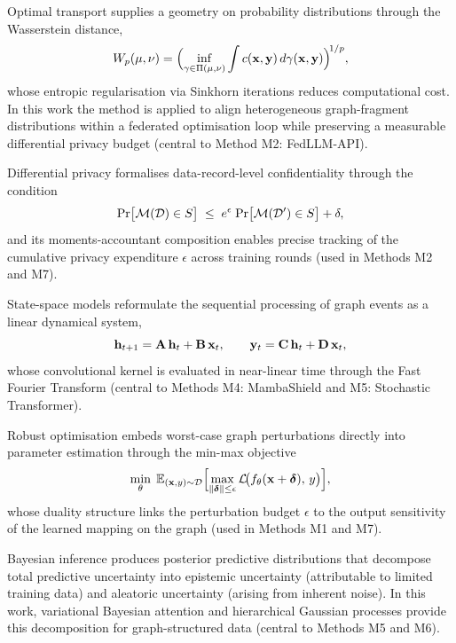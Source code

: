Optimal transport supplies a geometry on probability distributions through the Wasserstein distance,
\begin{equation}
W_p(\mu,\nu)
= \Bigl(\inf_{\gamma\in\Pi(\mu,\nu)}
    \int c(\mathbf{x},\mathbf{y})\,d\gamma(\mathbf{x},\mathbf{y})
  \Bigr)^{\!1/p},
\label{eq:wasserstein}
\end{equation}
whose entropic regularisation via Sinkhorn iterations reduces computational cost. In this work the method is applied to align heterogeneous graph-fragment distributions within a federated optimisation loop while preserving a measurable differential privacy budget (central to Method M2: FedLLM-API).

Differential privacy formalises data-record-level confidentiality through the condition
\begin{equation}
\mathrm{Pr}\bigl[\mathcal{M}(\mathcal{D})\in S\bigr]
\;\le\;
e^{\epsilon}\;\mathrm{Pr}\bigl[\mathcal{M}(\mathcal{D}')\in S\bigr] + \delta,
\label{eq:dp}
\end{equation}
and its moments-accountant composition enables precise tracking of the cumulative privacy expenditure $\epsilon$ across training rounds (used in Methods M2 and M7).

State-space models reformulate the sequential processing of graph events as a linear dynamical system,
\begin{equation}
\mathbf{h}_{t+1} = \mathbf{A}\,\mathbf{h}_t + \mathbf{B}\,\mathbf{x}_t, \qquad
\mathbf{y}_t = \mathbf{C}\,\mathbf{h}_t + \mathbf{D}\,\mathbf{x}_t,
\label{eq:ssm}
\end{equation}
whose convolutional kernel is evaluated in near-linear time through the Fast Fourier Transform (central to Methods M4: MambaShield and M5: Stochastic Transformer).

Robust optimisation embeds worst-case graph perturbations directly into parameter estimation through the min-max objective
\begin{equation}
\min_\theta\;
\mathbb{E}_{(\mathbf{x},y)\sim\mathcal{D}}
\Bigl[
  \max_{\|\boldsymbol{\delta}\|\le\epsilon}
    \mathcal{L}\!\bigl(f_\theta(\mathbf{x}+\boldsymbol{\delta}),\,y\bigr)
\Bigr],
\label{eq:robust_opt}
\end{equation}
whose duality structure links the perturbation budget $\epsilon$ to the output sensitivity of the learned mapping on the graph (used in Methods M1 and M7).

Bayesian inference produces posterior predictive distributions that decompose total predictive uncertainty into epistemic uncertainty (attributable to limited training data) and aleatoric uncertainty (arising from inherent noise). In this work, variational Bayesian attention and hierarchical Gaussian processes provide this decomposition for graph-structured data (central to Methods M5 and M6).

